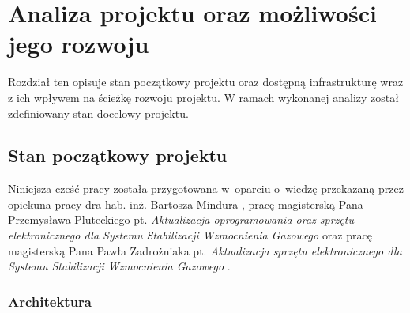 
\chapter{Analiza projektu oraz możliwości jego rozwoju}

Rozdział ten opisuje stan początkowy projektu oraz dostępną infrastrukturę wraz z ich wpływem na ścieżkę rozwoju projektu. W ramach wykonanej analizy został zdefiniowany stan docelowy projektu.

\section{Stan początkowy projektu}
\label{cha:pocz}

Niniejsza cześć pracy została przygotowana w~oparciu o~wiedzę przekazaną przez opiekuna pracy dra hab. inż. Bartosza Mindura \cite{Jinst}, pracę magisterską Pana Przemysława Pluteckiego pt. \textit{Aktualizacja oprogramowania oraz sprzętu elektronicznego dla Systemu Stabilizacji Wzmocnienia Gazowego} \cite{PluteckiMgr} oraz pracę magisterską Pana Pawła Zadrożniaka pt. \textit{Aktualizacja sprzętu elektronicznego dla Systemu Stabilizacji Wzmocnienia Gazowego} \cite{ZadrozniakMgr}.

\subsection{Architektura}

